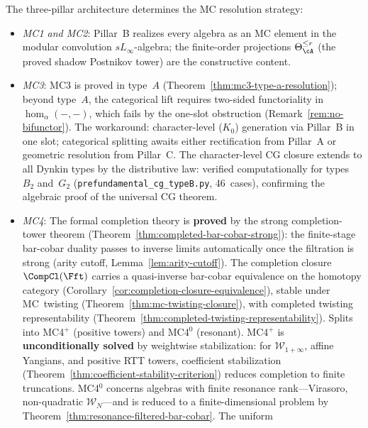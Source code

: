 \begin{remark}
\label{rem:three-pillar-mc-unification}
The three-pillar architecture determines the MC resolution strategy:
\begin{itemize}
\item \emph{MC1 and MC2}:  Pillar~B realizes every algebra as an MC
  element in the modular convolution $sL_\infty$-algebra; the
  finite-order projections $\Theta_\cA^{\leq r}$ (the proved shadow
  Postnikov tower) are the constructive content.
\item \emph{MC3}:  MC3 is proved in type~$A$ (Theorem~\ref{thm:mc3-type-a-resolution}); beyond type~$A$, the categorical lift requires two-sided functoriality
  in $\operatorname{hom}_\alpha(-,-)$, which fails by the one-slot
  obstruction (Remark~\ref{rem:no-bifunctor}).  The workaround:
  character-level ($K_0$) generation via Pillar~B in one slot;
  categorical splitting awaits either rectification from Pillar~A
  or geometric resolution from Pillar~C.
  The character-level CG closure extends to all Dynkin types by the distributive law: verified computationally for types~$B_2$ and~$G_2$ (\texttt{prefundamental\_cg\_typeB.py}, 46~cases), confirming the algebraic proof of the universal CG theorem.
\item \emph{MC4}:  The formal completion theory is \textbf{proved} by
  the strong completion-tower theorem
  (Theorem~\ref{thm:completed-bar-cobar-strong}): the finite-stage
  bar-cobar duality passes to inverse limits automatically once the
  filtration is strong (arity cutoff, Lemma~\ref{lem:arity-cutoff}).
  The completion closure $\CompCl(\Fft)$ carries a quasi-inverse
  bar-cobar equivalence on the homotopy category
  (Corollary~\ref{cor:completion-closure-equivalence}), stable under
  MC~twisting (Theorem~\ref{thm:mc-twisting-closure}), with completed
  twisting representability
  (Theorem~\ref{thm:completed-twisting-representability}).
  Splits into MC4$^+$ (positive towers) and MC4$^0$ (resonant).
  MC4$^+$ is \textbf{unconditionally solved} by weightwise
  stabilization: for $\mathcal{W}_{1+\infty}$, affine Yangians, and
  positive RTT towers, coefficient stabilization
  (Theorem~\ref{thm:coefficient-stability-criterion}) reduces
  completion to finite truncations.  MC4$^0$ concerns algebras with
  finite resonance rank---Virasoro, non-quadratic
  $\mathcal{W}_N$---and is reduced to a finite-dimensional problem
  by Theorem~\ref{thm:resonance-filtered-bar-cobar}.  The uniform

\end{itemize}
\end{remark}
